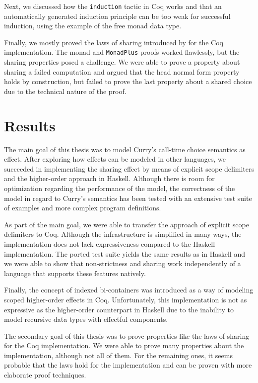 \documentclass[a4paper, 11pt, fleqn, twoside]{scrreprt}
\newcommand{\hinl}[1]{\texttt{#1}}
\newcommand{\cinl}[1]{\texttt{#1}}
\begin{document}
Next, we discussed how the \cinl{induction} tactic in Coq works and that an automatically generated induction principle can be too weak for successful induction, using the example of the free monad data type.

Finally, we mostly proved the laws of sharing introduced by \citet{fischer2009purely} for the Coq implementation.
The monad and \hinl{MonadPlus} proofs worked flawlessly, but the sharing properties posed a challenge.
We were able to prove a property about sharing a failed computation and argued that the head normal form property holds by construction, but failed to prove the last property about a shared choice due to the technical nature of the proof.

\section{Results}
The main goal of this thesis was to model Curry's call-time choice semantics as effect.
After exploring how effects can be modeled in other languages, we succeeded in implementing the sharing effect by means of explicit scope delimiters and the higher-order approach in Haskell.
Although there is room for optimization regarding the performance of the model, the correctness of the model in regard to Curry's semantics has been tested with an extensive test suite of examples and more complex program definitions.

As part of the main goal, we were able to transfer the approach of explicit scope delimiters to Coq.
Although the infrastructure is simplified in many ways, the implementation does not lack expressiveness compared to the Haskell implementation.
The ported test suite yields the same results as in Haskell and we were able to show that non-strictness and sharing work independently of a language that supports these features natively.

Finally, the concept of indexed bi-containers was introduced as a way of modeling scoped higher-order effects in Coq.
Unfortunately, this implementation is not as expressive as the higher-order counterpart in Haskell due to the inability to model recursive data types with effectful components.

The secondary goal of this thesis was to prove properties like the laws of sharing for the Coq implementation.
We were able to prove many properties about the implementation, although not all of them. 
For the remaining ones, it seems probable that the laws hold for the implementation and can be proven with more elaborate proof techniques.
\end{document}
